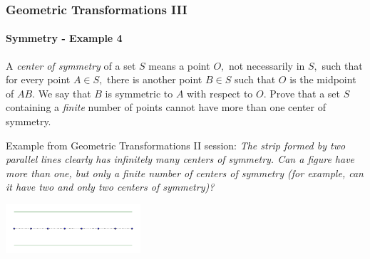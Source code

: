 \documentclass[8pt,xcolor=table,dvipsnames]{beamer}
\begin{document}
\begin{frame}[t]
    \frametitle{Geometric Transformations III}
    \framesubtitle{Symmetry - Example 4}
    \begin{example}
        A \textit{center of symmetry} of a set $S$ means a point $O,$ not necessarily in $S,$ such that for every point $A \in S,$
        there is another point $B \in S$ such that $O$ is the midpoint of $AB.$ We say that $B$ is symmetric to $A$ with respect to $O.$
        \bigbreak
        Prove that a set $S$ containing a \textit{finite} number of points cannot have more than one center of symmetry.
    \end{example}
    \bigbreak
    Example from Geometric Transformations II session:
    \bigbreak
    \textit{The strip formed by two parallel lines clearly has infinitely many centers of symmetry.
    Can a figure have more than one, but only a finite number of centers of symmetry (for example, can it have two and only two centers of symmetry)?}
    \begin{center}
        \includegraphics[width=5cm]{./svg/pdf/rotation-9.pdf}
    \end{center}
\end{frame}
\end{document}
